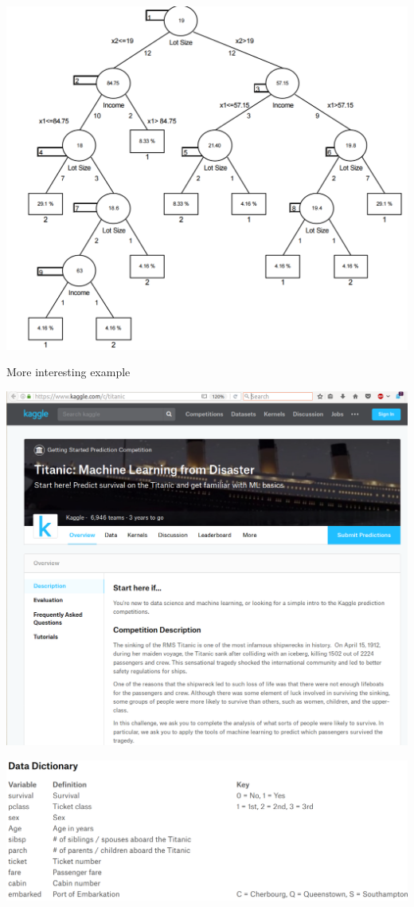 \documentclass[xcolor=table,aspectratio=169]{beamer}
\begin{document}
\begin{frame}
	\includegraphics[height=\textheight]{pics/tree_final.png}
\end{frame}
\begin{frame}
	More interesting example
\end{frame}


\begin{frame}
	\includegraphics[height=\textheight]{pics/kaggle_scr.png}
\end{frame}
\begin{frame}
	\includegraphics[width=\textwidth]{pics/scr_dict.png}
\end{frame}
\end{document}
